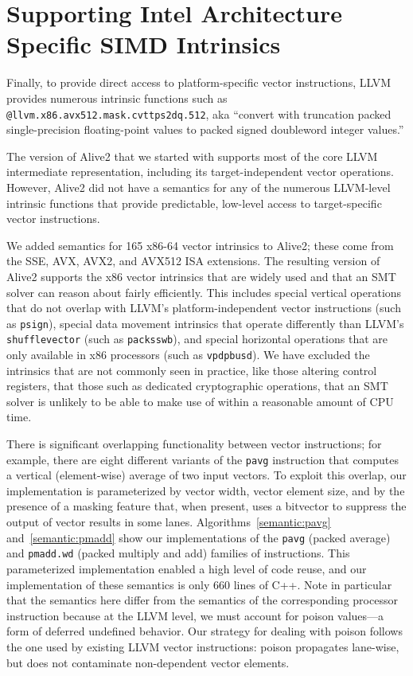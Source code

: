 \section{Supporting Intel Architecture Specific SIMD Intrinsics}

%
Finally, to provide direct access to platform-specific vector
instructions, LLVM provides numerous intrinsic functions such as
\texttt{@llvm.x86.avx512.mask.cvttps2dq.512}, aka ``convert with
truncation packed single-precision floating-point values to packed
signed doubleword integer values.''





The version of Alive2 that we started with supports most of the core
LLVM intermediate representation, including its target-independent
vector operations.
%
However, Alive2 did not have a semantics for any of the numerous
LLVM-level intrinsic functions that provide predictable, low-level
access to target-specific vector instructions.


We added semantics for 165 x86-64 vector intrinsics to Alive2; these
come from the SSE, AVX, AVX2, and AVX512 ISA extensions.
%
The resulting version of Alive2 supports the x86 vector intrinsics
that are widely used and that an SMT solver can reason about fairly
efficiently.
%
This includes special vertical operations that do not overlap with
LLVM's platform-independent vector instructions (such as
\texttt{psign}), special data movement intrinsics that operate
differently than LLVM's \texttt{shufflevector} (such as
\texttt{packsswb}), and special horizontal operations that are only
available in x86 processors (such as \texttt{vpdpbusd}). We have
excluded the intrinsics that are not commonly seen in practice, like
those altering control registers, that those such as dedicated
cryptographic operations, that an SMT solver is unlikely to be able to
make use of within a reasonable amount of CPU time.


There is significant overlapping functionality between vector
instructions; for example, there are eight different variants of the
\texttt{pavg} instruction that computes a vertical (element-wise)
average of two input vectors.
%
To exploit this overlap, our implementation is parameterized by vector
width, vector element size, and by the presence of a masking feature
that, when present, uses a bitvector to suppress the output of vector
results in some lanes.
%
Algorithms~\ref{semantic:pavg} and~\ref{semantic:pmadd} show our
implementations of the \texttt{pavg} (packed average) and
\texttt{pmadd.wd} (packed multiply and add) families of instructions.
%
This parameterized implementation enabled a high level of code reuse,
and our implementation of these semantics is only 660 lines of C++.
%
Note in particular that the semantics here differ from the semantics of
the corresponding processor instruction because at the LLVM level, we
must account for poison values---a form of deferred undefined
behavior.
%
Our strategy for dealing with poison follows the one used by existing
LLVM vector instructions: poison propagates lane-wise, but does not
contaminate non-dependent vector elements.


